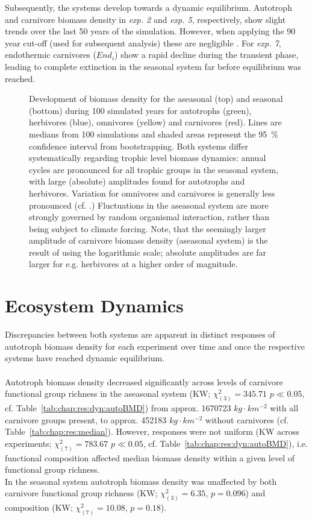Subsequently, the systems develop towards a dynamic equilibrium. 
Autotroph and carnivore  biomass density in \textit{exp. 2} and \textit{exp. 5}, respectively, show slight trends over the last 50 years of the simulation. 
However, when applying the 90 year cut-off (used for subsequent analysis) these are negligible . For \textit{exp. 7}, endothermic carnivores ($End_i$) show a rapid decline during the transient phase, leading to complete extinction in the seasonal system far before equilibrium was reached.
\begin{figure}[h!]
\centering

\caption[Log-body mass density time series for \textit{exp. 1} in both systems]{Development of biomass density for the aseasonal (top) and seasonal (bottom) during 100 simulated years for autotrophs (green), herbivores (blue), omnivores (yellow) and carnivores (red). Lines are medians from 100 simulations and shaded areas represent the 95~\% confidence interval from bootstrapping. Both systems differ systematically regarding trophic level biomass dynamics: annual cycles are pronounced for all trophic groups in the seasonal system, with large (absolute) amplitudes found for autotrophs and herbivores. Variation for omnivores and carnivores is generally less pronounced (cf. .) Fluctuations in the aseasonal system are more strongly governed by random organismal interaction, rather than being subject to climate forcing. Note, that the seemingly larger amplitude of carnivore biomass density (aseasonal system) is the result of using the logarithmic scale; absolute amplitudes are far larger for e.g. herbivores at a higher order of magnitude. }
\label{fig:chap:res:ts:expno1}
\end{figure}

\clearpage

\section{Ecosystem Dynamics}
\label{chap:res:dyn} 
Discrepancies between both systems are apparent in distinct responses of autotroph biomass density for each experiment over time and once the respective systems have reached dynamic equilibrium.\\\\
Autotroph biomass density decreased significantly across levels of carnivore functional group richness in the aseasonal system (KW; $\chi^{2}_{(3)} = 345.71$ $p \ll 0.05$, cf. Table~\ref{tab:chap:res:dyn:autoBMD}) from approx. 1670723 $kg\cdot km^{-2}$ with all carnivore groups present, to approx. 452183 $kg\cdot km^{-2}$ without carnivores (cf. Table~\ref{tab:chap:res:median}). 
However, responses were not uniform (KW across experiments; $\chi^{2}_{(7)} = 783.67$ $p \ll 0.05$, cf. Table~\ref{tab:chap:res:dyn:autoBMD}), i.e. functional composition affected median biomass density within a given level of functional group richness. \\
In the seasonal system autotroph biomass density was unaffected by both carnivore functional group richness (KW; $\chi^{2}_{(3)} = 6.35$, $p = 0.096$) and composition (KW; $\chi^{2}_{(7)} = 10.08$, $p = 0.18$).

